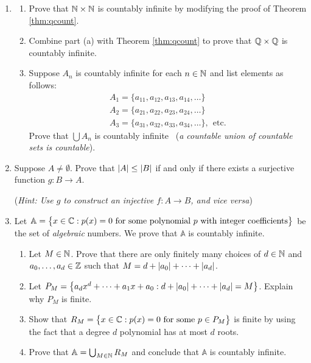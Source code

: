 \begin{exercises}{}{}
\begin{enumerate}
	
		\item\begin{enumerate}
		  \item Prove that $\mathbb{N}\times\mathbb{N}$ is countably infinite by modifying the proof of Theorem \ref{thm:qcount}.
			\item Combine part (a) with Theorem \ref{thm:qcount} to prove that $\mathbb{Q}\times\mathbb{Q}$ is countably infinite.
			\item\label{ex:cardunion} Suppose $A_n$ is countably infinite for each $n\in\mathbb{N}$ and list elements as follows:
		\begin{gather*}
			A_1=\{a_{11},a_{12},a_{13},a_{14},\ldots\}\\
			A_2=\{a_{21},a_{22},a_{23},a_{24},\ldots\}\\
			A_3=\{a_{31},a_{32},a_{33},a_{34},\ldots\},\ \ \text{etc.}
		\end{gather*}
		Prove that $\bigcup A_n$ is countably infinite \ (\emph{a countable union of countable sets is countable}).
		\end{enumerate}
	

		\bigskip

		\hspace{-\leftmargini}{Warning! The remaining exercises are significantly trickier.}
  
		\item Suppose $A\neq\emptyset$. Prove that $\left| A\right|\le \left| B\right|$ if and only if there exists a surjective function $g:B\to A$.\par
		(\emph{Hint: Use $g$ to construct an injective $f:A\to B$, and vice versa})
		
			
		\item \label{exs:algcard} Let $\mathbb A=\bigl\{x\in\mathbb{C}:p(x)=0\text{ for some polynomial $p$ with integer coefficients}\bigr\}$ be the set of \emph{algebraic} numbers. We prove that $\mathbb A$ is countably infinite.
	\begin{enumerate}
	    \item Let $M\in\mathbb{N}$. Prove that there are only finitely many choices of $d\in\mathbb{N}$ and $a_0,\ldots,a_d\in\mathbb{Z}$ such that $M=d+\left| a_0\right|+\cdots +\left| a_d\right|$.
	    \item Let $P_M=\bigl\{a_dx^d+\cdots +a_1x+a_0:d+\left| a_0\right|+\cdots +\left| a_d\right|=M\bigr\}$. Explain why $P_M$ is finite.
	    \item Show that $R_M=\bigl\{x\in\mathbb{C}:p(x)=0\text{ for some } p\in P_M\bigr\}$ is finite by using the fact that a degree $d$ polynomial has at most $d$ roots.
	    \item Prove that $\mathbb A=\bigcup_{M\in\mathbb{N}}R_M$ and conclude that $\mathbb A$ is countably infinite.
	\end{enumerate}
		

\end{enumerate}
\end{exercises}
